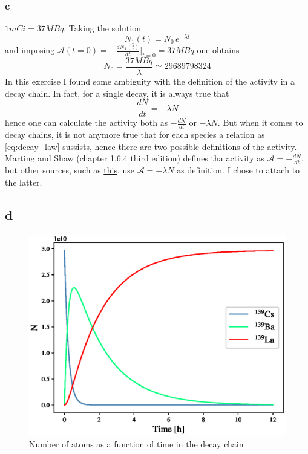 \subsubsection*{c}
$1mCi = 37MBq$. Taking the solution
\begin{equation*}
    N_1(t) = N_0 \, e^{-\lambda t}
\end{equation*}
and imposing $\mathcal{A}(t=0) = -\frac{dN_1(t)}{dt}|_{t=0} = 37MBq$ one obtains
\begin{equation*}
    N_0 = \frac{37 MBq}{\lambda} \simeq 29689798324
\end{equation*}
In this exercise I found some ambiguity with the definition of the activity in a decay chain. In fact, for a single decay, it is always true that 
\begin{equation}
    \frac{dN}{dt} = - \lambda N
    \label{eq:decay_law}
\end{equation}
hence one can calculate the activity both as $-\frac{dN}{dt}$ or $-\lambda N$. But when it comes to 
decay chains, it is not anymore true that for each species a relation as \ref{eq:decay_law} sussists, hence there are two possible definitions of the activity. Marting and Shaw (chapter 1.6.4 third edition)
defines tha activity as $\mathcal{A} = -\frac{dN}{dt}$, but other sources, such as \href{https://en.wikipedia.org/wiki/Radioactive_decay#Rates}{this}, use $\mathcal{A} = -\lambda N$ as definition. I chose to attach to the latter.
\subsection*{d}
\begin{figure}[htbp]
    \centering
    \includegraphics[scale=0.8]{ex7/decay.eps}
    \caption{Number of atoms as a function of time in the decay chain}
    \label{fig:decay_chain}
\end{figure}

